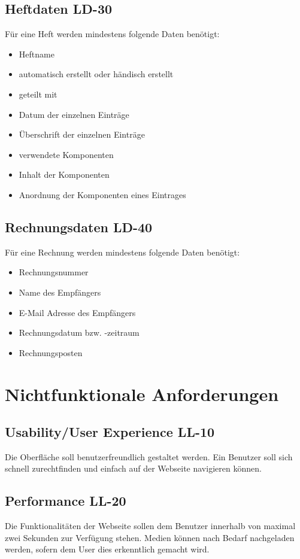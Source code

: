 \documentclass[12pt,a4paper,oneside,ngerman]{scrartcl}
\begin{document}
\subsection[Heftdaten]{Heftdaten \hfill LD-30}
Für eine Heft werden mindestens folgende Daten benötigt:
\begin{itemize}
\item Heftname
\item automatisch erstellt oder händisch erstellt
\item geteilt mit
\item Datum der einzelnen Einträge
\item Überschrift der einzelnen Einträge
\item verwendete Komponenten
\item Inhalt der Komponenten
\item Anordnung der Komponenten eines Eintrages
\end{itemize}

\subsection[Rechnungsdaten]{Rechnungsdaten \hfill LD-40}
Für eine Rechnung werden mindestens folgende Daten benötigt:
\begin{itemize}
\item Rechnungsnummer
\item Name des Empfängers
\item E-Mail Adresse des Empfängers
\item Rechnungsdatum bzw. -zeitraum
\item Rechnungsposten
\end{itemize}

\section{Nichtfunktionale Anforderungen}
\subsection[Usability/User Experience]{Usability/User Experience \hfill LL-10}
Die Oberfläche soll benutzerfreundlich gestaltet werden. Ein Benutzer soll sich schnell zurechtfinden und einfach auf der Webseite navigieren können. 

\subsection[Performance]{Performance \hfill LL-20}
Die Funktionalitäten der Webseite sollen dem Benutzer innerhalb von maximal zwei Sekunden zur Verfügung stehen. Medien können nach Bedarf nachgeladen werden, sofern dem User dies erkenntlich gemacht wird.
\end{document}
